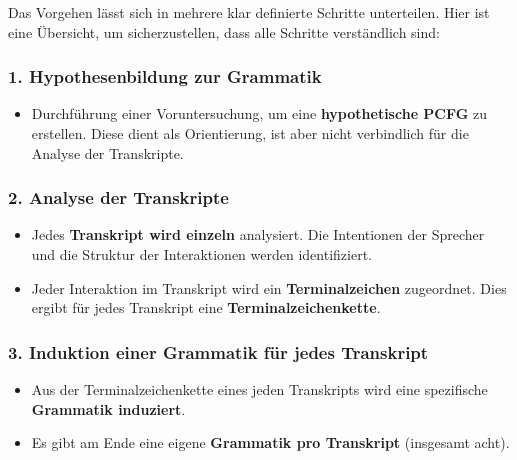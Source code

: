 \documentclass[
]{article}
\begin{document}
Das Vorgehen lässt sich in mehrere klar definierte Schritte unterteilen.
Hier ist eine Übersicht, um sicherzustellen, dass alle Schritte
verständlich sind:

\subsubsection{\texorpdfstring{1. \textbf{Hypothesenbildung zur
Grammatik}}{1. Hypothesenbildung zur Grammatik}}\label{hypothesenbildung-zur-grammatik}

\begin{itemize}
\item
  Durchführung einer Voruntersuchung, um eine \textbf{hypothetische
  PCFG} zu erstellen. Diese dient als Orientierung, ist aber nicht
  verbindlich für die Analyse der Transkripte.
\end{itemize}

\subsubsection{\texorpdfstring{2. \textbf{Analyse der
Transkripte}}{2. Analyse der Transkripte}}\label{analyse-der-transkripte}

\begin{itemize}
\item
  Jedes \textbf{Transkript wird einzeln} analysiert. Die Intentionen der
  Sprecher und die Struktur der Interaktionen werden identifiziert.
\item
  Jeder Interaktion im Transkript wird ein \textbf{Terminalzeichen}
  zugeordnet. Dies ergibt für jedes Transkript eine
  \textbf{Terminalzeichenkette}.
\end{itemize}

\subsubsection{\texorpdfstring{3. \textbf{Induktion einer Grammatik für
jedes
Transkript}}{3. Induktion einer Grammatik für jedes Transkript}}\label{induktion-einer-grammatik-fuxfcr-jedes-transkript}

\begin{itemize}
\item
  Aus der Terminalzeichenkette eines jeden Transkripts wird eine
  spezifische \textbf{Grammatik induziert}.
\item
  Es gibt am Ende eine eigene \textbf{Grammatik pro Transkript}
  (insgesamt acht).
\end{itemize}
\end{document}
